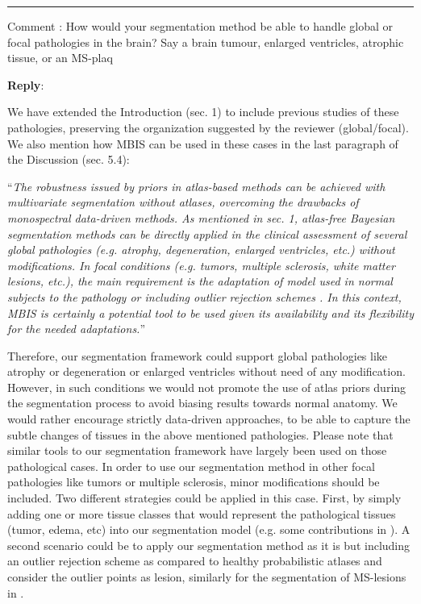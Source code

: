 \documentclass{memoir}
\newcounter{reviewpoint}
\newenvironment{reviewpoint}%
{\refstepcounter{reviewpoint}\par\medskip\vspace{3ex}\hrule\vspace{1.5ex}\par\noindent%
   {\fontseries{b}\selectfont Comment \arabic{reviewpoint}:} \fontshape{it}\selectfont }
{\label{com:\thereviewpoint}\par\medskip}
\newcommand{\reply}{\par\fontshape{n}\selectfont \noindent \textbf{Reply}:\ }
\begin{document}
\begin{reviewpoint}
How would your segmentation method be able to handle global or focal pathologies in the brain? 
Say a brain tumour, enlarged ventricles, atrophic tissue, or an MS-plaq
\reply{We have extended the Introduction (sec. 1) to include previous studies of these pathologies, preserving 
  the organization suggested by the reviewer (global/focal). 
We also mention how MBIS can be used in these cases in the last paragraph of the Discussion (sec. 5.4):

``\emph{The robustness issued by priors in atlas-based methods can be achieved
  with multivariate segmentation without atlases, overcoming the drawbacks of
  monospectral data-driven methods.
As mentioned in sec. 1, atlas-free Bayesian segmentation methods
  can be directly applied in the clinical assessment of several global pathologies (e.g.
  atrophy, degeneration, enlarged ventricles, etc.) without modifications.
In focal conditions (e.g. tumors, multiple sclerosis, white matter lesions, etc.),
  the main requirement is the adaptation of model used in normal subjects to the
  pathology or including outlier rejection schemes \citep{van_leemput_automated_2001}.
In this context, MBIS is certainly a potential tool to be used given its 
  availability and its flexibility for the needed adaptations.}''

Therefore, our segmentation framework could support global pathologies like atrophy or degeneration or enlarged ventricles without need of any modification. However, in such conditions we would not promote the use of atlas priors during the segmentation process to avoid biasing results towards normal anatomy. We would rather encourage strictly data-driven approaches, to be able to capture the subtle changes of tissues in the above mentioned pathologies. Please note that similar tools to our segmentation framework have largely been used on those pathological cases.
In order to use our segmentation method in other focal pathologies like tumors or multiple sclerosis, minor modifications should be included. Two different strategies could be applied in this case. First, by simply adding one or more tissue classes that would represent the pathological tissues (tumor, edema, etc) into our segmentation model (e.g. some contributions in \citep{menze_challenge_2013}). A second scenario could be to apply our segmentation method as it is but including an outlier rejection scheme as compared to healthy probabilistic atlases and consider the outlier points as lesion, similarly for the segmentation of MS-lesions in \citep{van_leemput_automated_2001}. }
\end{reviewpoint}


%
%
\end{document}
